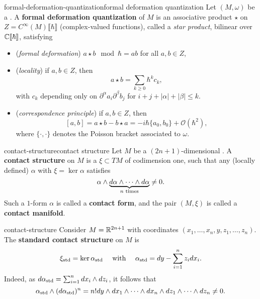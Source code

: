 \begin{topic}{formal-deformation-quantization}{formal deformation quantization}
    Let $(M, \omega)$ be a . A \textbf{formal deformation quantization} of $M$ is an associative product $\star$ on $Z = C^\infty(M) \llbracket \hbar \rrbracket$ (complex-valued functions), called a \textit{star product}, bilinear over $\mathbb{C} \llbracket \hbar \rrbracket$, satisfying
    \begin{itemize}
        \item (\textit{formal deformation}) $a \star b \mod \hbar = ab$ for all $a, b \in Z$,
        \item (\textit{locality}) if $a, b \in Z$, then
        \[ a \star b = \sum_{k \ge 0} \hbar^k c_k , \]
        with $c_k$ depending only on $\partial^\alpha a_i \partial^\beta b_j$ for $i + j + |\alpha| + |\beta| \le k$.
        \item (\textit{correspondence principle}) if $a, b \in Z$, then
        \[ [a, b] = a \star b - b \star a = - i \hbar \{ a_0, b_0 \} + \mathcal{O}(\hbar^2) , \]
        where $\{ \cdot, \cdot \}$ denotes the Poisson bracket associated to $\omega$.
    \end{itemize}
\end{topic}

\begin{topic}{contact-structure}{contact structure}
    Let $M$ be a $(2n + 1)$-dimensional . A \textbf{contact structure} on $M$ is a  $\xi \subset TM$ of codimension one, such that any (locally defined)  $\alpha$ with $\xi = \ker \alpha$ satisfies
    \[ \alpha \wedge \underbrace{d \alpha \wedge \cdots \wedge d \alpha}_{n \textup{ times}} \ne 0 . \]
    Such a $1$-form $\alpha$ is called a \textbf{contact form}, and the pair $(M, \xi)$ is called a \textbf{contact manifold}.
\end{topic}

\begin{example}{contact-structure}
    Consider $M = \mathbb{R}^{2n + 1}$ with coordinates $(x_1, \ldots, x_n, y, z_1, \ldots, z_n)$. The \textbf{standard contact structure} on $M$ is
    \[ \xi_\textup{std} = \ker \alpha_\textup{std} \quad \textup{ with } \quad \alpha_\textup{std} = dy - \sum_{i = 1}^{n} z_i d x_i . \]
    Indeed, as $d \alpha_\textup{std} = \sum_{i = 1}^{n} dx_i \wedge dz_i$, it follows that
    \[ \alpha_\textup{std} \wedge (d \alpha_\textup{std})^n = n! dy \wedge dx_1 \wedge \cdots \wedge dx_n \wedge dz_1 \wedge \cdots \wedge dz_n \ne 0 . \]
\end{example}

